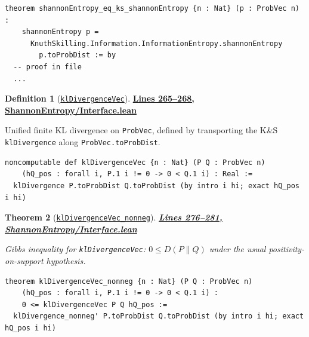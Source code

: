 \documentclass[11pt]{article}
\newtheorem{theorem}{Theorem}[section]
\theoremstyle{definition}
\newtheorem{definition}[theorem]{Definition}
\theoremstyle{remark}
\begin{document}
\begin{lstlisting}[caption={Shannon entropy: ProbVec version equals KS ProbDist version}]
theorem shannonEntropy_eq_ks_shannonEntropy {n : Nat} (p : ProbVec n) :
    shannonEntropy p =
      KnuthSkilling.Information.InformationEntropy.shannonEntropy
        p.toProbDist := by
  -- proof in file
  ...
\end{lstlisting}

\begin{definition}[\href{https://github.com/zariuq/ks-foundations-of-inference/blob/main/InformationTheory/ShannonEntropy/Interface.lean\#L266}{\texttt{klDivergenceVec}}]
\textbf{\href{https://github.com/zariuq/ks-foundations-of-inference/blob/main/InformationTheory/ShannonEntropy/Interface.lean\#L265-L268}{Lines 265--268, ShannonEntropy/Interface.lean}}

Unified finite KL divergence on \texttt{ProbVec}, defined by transporting the K\&S \texttt{klDivergence}
along \texttt{ProbVec.toProbDist}.
\end{definition}

\begin{lstlisting}[caption={KL divergence on ProbVec (via KS klDivergence)}]
noncomputable def klDivergenceVec {n : Nat} (P Q : ProbVec n)
    (hQ_pos : forall i, P.1 i != 0 -> 0 < Q.1 i) : Real :=
  klDivergence P.toProbDist Q.toProbDist (by intro i hi; exact hQ_pos i hi)
\end{lstlisting}

\begin{theorem}[\href{https://github.com/zariuq/ks-foundations-of-inference/blob/main/InformationTheory/ShannonEntropy/Interface.lean\#L278}{\texttt{klDivergenceVec\_nonneg}}]
\textbf{\href{https://github.com/zariuq/ks-foundations-of-inference/blob/main/InformationTheory/ShannonEntropy/Interface.lean\#L276-L281}{Lines 276--281, ShannonEntropy/Interface.lean}}

Gibbs inequality for \texttt{klDivergenceVec}: $0 \le D(P\|Q)$ under the usual positivity-on-support
hypothesis.
\end{theorem}

\begin{lstlisting}[caption={Gibbs inequality on ProbVec}]
theorem klDivergenceVec_nonneg {n : Nat} (P Q : ProbVec n)
    (hQ_pos : forall i, P.1 i != 0 -> 0 < Q.1 i) :
    0 <= klDivergenceVec P Q hQ_pos :=
  klDivergence_nonneg' P.toProbDist Q.toProbDist (by intro i hi; exact hQ_pos i hi)
\end{lstlisting}
\end{document}
